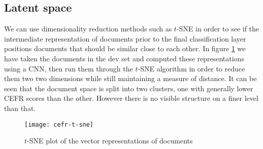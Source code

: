 \subsection{Latent space}

We can use dimensionality reduction methods such as $t$-SNE in order to see
if the intermediate representation of documents prior to the final
classification layer positions documents that should be similar close to each
other. In figure \ref{fig:cefr-t-sne} we have taken the documents in the dev
set and computed these representations using a \ac{CNN}, then run them through
the $t$-SNE algorithm in order to reduce them two two dimensions while still
maintaining a measure of distance. It can be seen that the document space
is split into two clusters, one with generally lower CEFR scores than the
other. However there is no visible structure on a finer level than that.

\begin{figure}
  \centering
  \texttt{[image: cefr-t-sne]}
  \caption{$t$-SNE plot of the vector representations of documents}
  \label{fig:cefr-t-sne}
\end{figure}
